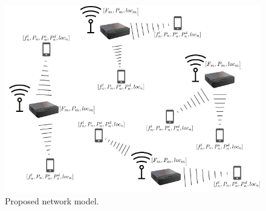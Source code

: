 \begin{figure}[H]
  \centering
  \includegraphics[width=\textwidth]{images/proposed_network.png}
  \caption{Proposed network model.} \label{proposed_network}
\end{figure}

